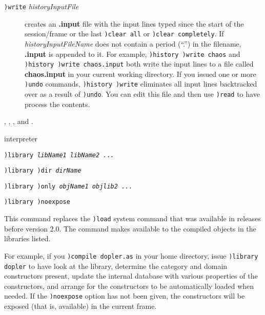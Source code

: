 {{{{{{{\begin{description}
\item[{\tt )write} {\it historyInputFile}]
creates an {\bf .input} file with the input lines typed since the start
of the session/frame or the last {\tt )clear all} or {\tt )clear
completely}.
If {\it historyInputFileName} does not contain a period (``.'') in the filename,
{\bf .input} is appended to it.
For example,
{\tt )history )write chaos}
and
{\tt )history )write chaos.input}
both write the input lines to a file called {\bf chaos.input} in your
current working directory.
If you issued one or more {\tt )undo} commands,
{\tt )history )write}
eliminates all
input lines backtracked over as a result of {\tt )undo}.
You can edit this file and then use {\tt )read} to have \Language{} process
the contents.
\end{description}

\par{}
,
,
, and
.




\par{} interpreter

\par{}
\begin{simpleList}
\item{\tt )library {\it libName1  \lanb{}libName2 ...\ranb{}}}
\item{\tt )library )dir {\it dirName}}
\item{\tt )library )only {\it objName1  \lanb{}objlib2 ...\ranb{}}}
\item{\tt )library )noexpose}
\end{simpleList}

\par{}

This command replaces the {\tt )load} system command that
was available in \Language{} releases before version 2.0.
The  command makes available to \Language{} the compiled
objects in the libraries listed.

For example, if you {\tt )compile dopler.as} in your home
directory, issue {\tt )library dopler} to have \Language{} look
at the library, determine the category and domain constructors present,
update the internal database with various properties of the
constructors, and arrange for the constructors to be
automatically loaded when needed.
If the {\tt )noexpose} option has not been given, the
constructors will be exposed (that is, available) in the current
frame.

}}}}}}}
